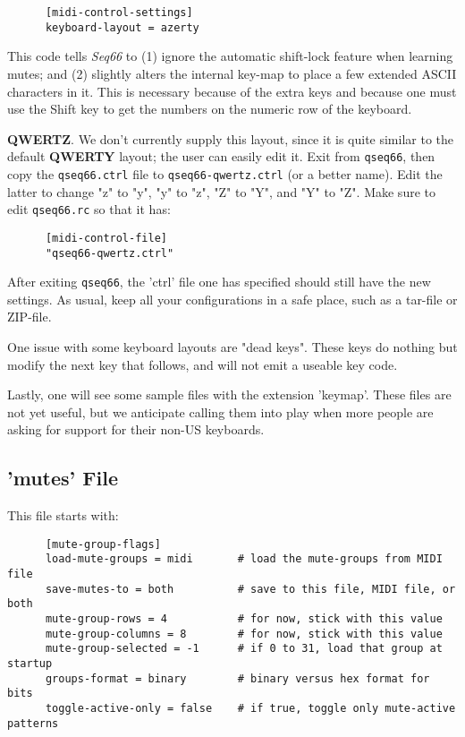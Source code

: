    \begin{verbatim}
      [midi-control-settings]
      keyboard-layout = azerty
   \end{verbatim}

   This code tells \textsl{Seq66} to (1) ignore the automatic shift-lock
   feature when learning mutes; and (2) slightly alters the internal key-map to
   place a few extended ASCII characters in it.  This is necessary because of
   the extra keys and because one must use the Shift key to get the numbers on
   the numeric row of the keyboard.

   \textbf{QWERTZ}.
   We don't currently supply this layout, since it is quite similar to the
   default \textbf{QWERTY} layout; the user can easily edit it.
   Exit from \texttt{qseq66}, then copy the \texttt{qseq66.ctrl}
   file to \texttt{qseq66-qwertz.ctrl} (or a better name).  Edit the latter to
   change "z" to "y", "y" to "z", "Z" to "Y", and "Y" to "Z".
   Make sure to edit \texttt{qseq66.rc} so that it has:

   \begin{verbatim}
      [midi-control-file]
      "qseq66-qwertz.ctrl"
   \end{verbatim}

   After exiting \texttt{qseq66}, the 'ctrl' file one has specified
   should still have the new settings.
   As usual, keep all your configurations in a safe place, such as a tar-file or
   ZIP-file.

   One issue with some keyboard layouts are "dead keys".  These keys do
   nothing but modify the next key that follows, and will not emit
   a useable key code.

   Lastly, one will see some sample files with the extension 'keymap'.
   These files are not yet useful, but we anticipate calling them into play
   when more people are asking for support for their non-US keyboards.

\subsection{'mutes' File}
\label{subsubsec:configuration_mute_group_control}

   This file starts with:

   \begin{verbatim}
      [mute-group-flags]
      load-mute-groups = midi       # load the mute-groups from MIDI file
      save-mutes-to = both          # save to this file, MIDI file, or both
      mute-group-rows = 4           # for now, stick with this value
      mute-group-columns = 8        # for now, stick with this value
      mute-group-selected = -1      # if 0 to 31, load that group at startup
      groups-format = binary        # binary versus hex format for bits
      toggle-active-only = false    # if true, toggle only mute-active patterns
   \end{verbatim}

